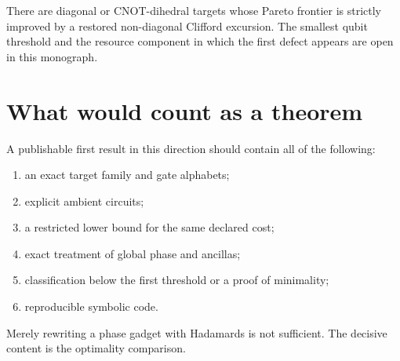 \begin{conjecturebox}
There are diagonal or CNOT-dihedral targets whose Pareto frontier is strictly improved by a restored non-diagonal Clifford excursion.  The smallest qubit threshold and the resource component in which the first defect appears are open in this monograph.
\end{conjecturebox}

\section{What would count as a theorem}
A publishable first result in this direction should contain all of the following:
\begin{enumerate}
\item an exact target family and gate alphabets;
\item explicit ambient circuits;
\item a restricted lower bound for the same declared cost;
\item exact treatment of global phase and ancillas;
\item classification below the first threshold or a proof of minimality;
\item reproducible symbolic code.
\end{enumerate}
Merely rewriting a phase gadget with Hadamards is not sufficient.  The decisive content is the optimality comparison.
